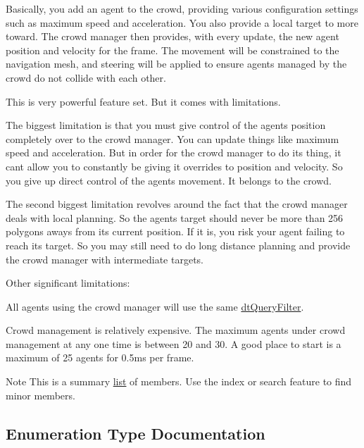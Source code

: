 Basically, you add an agent to the crowd, providing various configuration settings such as maximum speed and acceleration. You also provide a local target to more toward. The crowd manager then provides, with every update, the new agent position and velocity for the frame. The movement will be constrained to the navigation mesh, and steering will be applied to ensure agents managed by the crowd do not collide with each other.

This is very powerful feature set. But it comes with limitations.

The biggest limitation is that you must give control of the agent\textquotesingle{}s position completely over to the crowd manager. You can update things like maximum speed and acceleration. But in order for the crowd manager to do its thing, it can\textquotesingle{}t allow you to constantly be giving it overrides to position and velocity. So you give up direct control of the agent\textquotesingle{}s movement. It belongs to the crowd.

The second biggest limitation revolves around the fact that the crowd manager deals with local planning. So the agent\textquotesingle{}s target should never be more than 256 polygons aways from its current position. If it is, you risk your agent failing to reach its target. So you may still need to do long distance planning and provide the crowd manager with intermediate targets.

Other significant limitations\+:


\begin{DoxyItemize}
\item All agents using the crowd manager will use the same \hyperlink{classdtQueryFilter}{dt\+Query\+Filter}.
\item Crowd management is relatively expensive. The maximum agents under crowd management at any one time is between 20 and 30. A good place to start is a maximum of 25 agents for 0.\+5ms per frame.
\end{DoxyItemize}

\begin{DoxyNote}{Note}
This is a summary \hyperlink{protocollist-p}{list} of members. Use the index or search feature to find minor members. 
\end{DoxyNote}


\subsection{Enumeration Type Documentation}
\mbox{\label{group__crowd_ga59bc9aa54705292d8f0f1ad9ca48ca82}} 
